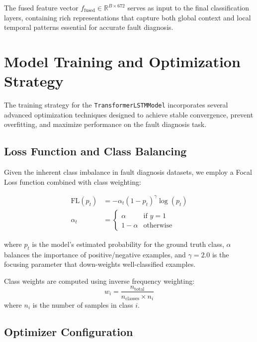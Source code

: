 The fused feature vector $f_{\text{fused}} \in \mathbb{R}^{B \times 672}$ serves as input to the final classification layers, containing rich representations that capture both global context and local temporal patterns essential for accurate fault diagnosis.

\section{Model Training and Optimization Strategy}
\label{sec:hybrid_model:training_optimization}

The training strategy for the \texttt{TransformerLSTMModel} incorporates several advanced optimization techniques designed to achieve stable convergence, prevent overfitting, and maximize performance on the fault diagnosis task.

\subsection{Loss Function and Class Balancing}
\label{subsec:loss_function}

Given the inherent class imbalance in fault diagnosis datasets, we employ a Focal Loss function combined with class weighting:

\begin{align}
\text{FL}(p_t) &= -\alpha_t(1-p_t)^{\gamma}\log(p_t) \\
\alpha_t &= \begin{cases} 
\alpha & \text{if } y = 1 \\
1-\alpha & \text{otherwise}
\end{cases}
\end{align}

where $p_t$ is the model's estimated probability for the ground truth class, $\alpha$ balances the importance of positive/negative examples, and $\gamma = 2.0$ is the focusing parameter that down-weights well-classified examples.

Class weights are computed using inverse frequency weighting:
\begin{equation}
w_i = \frac{n_{\text{total}}}{n_{\text{classes}} \times n_i}
\end{equation}
where $n_i$ is the number of samples in class $i$.

\subsection{Optimizer Configuration}
\label{subsec:optimizer}

